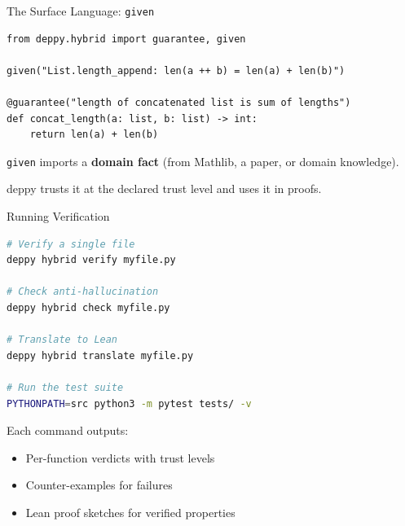 \documentclass[aspectratio=169,11pt]{beamer}
\begin{document}
\begin{frame}{The Surface Language: \texttt{given}}
\begin{lstlisting}[language=deppy]
from deppy.hybrid import guarantee, given

given("List.length_append: len(a ++ b) = len(a) + len(b)")

@guarantee("length of concatenated list is sum of lengths")
def concat_length(a: list, b: list) -> int:
    return len(a) + len(b)
\end{lstlisting}

\vspace{0.5em}
\texttt{given} imports a \textbf{domain fact} (from Mathlib, a paper, or domain knowledge).

\vspace{0.3em}
deppy trusts it at the declared trust level and uses it in proofs.
\end{frame}

\begin{frame}{Running Verification}
\begin{lstlisting}[language=bash, basicstyle=\small\ttfamily]
# Verify a single file
deppy hybrid verify myfile.py

# Check anti-hallucination
deppy hybrid check myfile.py

# Translate to Lean
deppy hybrid translate myfile.py

# Run the test suite
PYTHONPATH=src python3 -m pytest tests/ -v
\end{lstlisting}

\vspace{0.5em}
Each command outputs:
\begin{itemize}
\item Per-function verdicts with trust levels
\item Counter-examples for failures
\item Lean proof sketches for verified properties
\end{itemize}
\end{frame}
\end{document}
